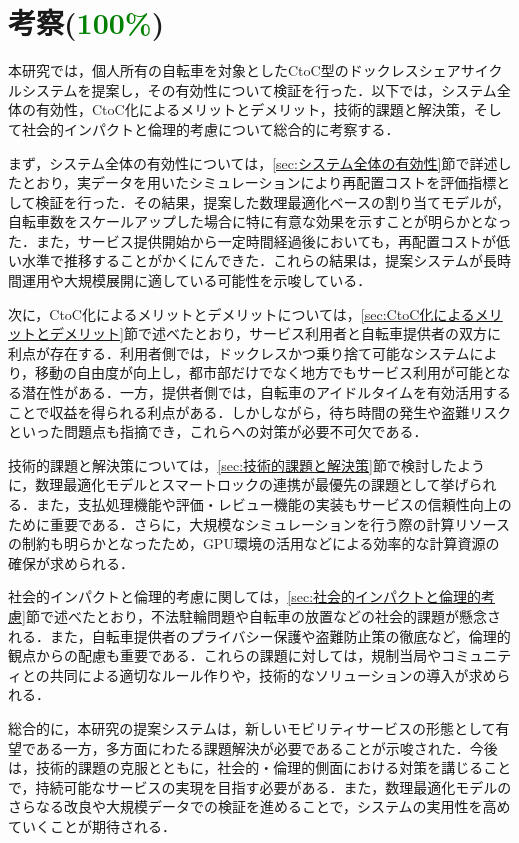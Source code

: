 \clearpage
\newpage

\section{考察(\textcolor{green}{100\%})}
  \label{sec:考察}
    \par 本研究では，個人所有の自転車を対象としたCtoC型のドックレスシェアサイクルシステムを提案し，その有効性について検証を行った．以下では，システム全体の有効性，CtoC化によるメリットとデメリット，技術的課題と解決策，そして社会的インパクトと倫理的考慮について総合的に考察する．
    \par まず，システム全体の有効性については，\ref{sec:システム全体の有効性}節で詳述したとおり，実データを用いたシミュレーションにより再配置コストを評価指標として検証を行った．その結果，提案した数理最適化ベースの割り当てモデルが，自転車数をスケールアップした場合に特に有意な効果を示すことが明らかとなった．また，サービス提供開始から一定時間経過後においても，再配置コストが低い水準で推移することがかくにんできた．これらの結果は，提案システムが長時間運用や大規模展開に適している可能性を示唆している．
    \par 次に，CtoC化によるメリットとデメリットについては，\ref{sec:CtoC化によるメリットとデメリット}節で述べたとおり，サービス利用者と自転車提供者の双方に利点が存在する．利用者側では，ドックレスかつ乗り捨て可能なシステムにより，移動の自由度が向上し，都市部だけでなく地方でもサービス利用が可能となる潜在性がある．一方，提供者側では，自転車のアイドルタイムを有効活用することで収益を得られる利点がある．しかしながら，待ち時間の発生や盗難リスクといった問題点も指摘でき，これらへの対策が必要不可欠である．
    \par 技術的課題と解決策については，\ref{sec:技術的課題と解決策}節で検討したように，数理最適化モデルとスマートロックの連携が最優先の課題として挙げられる．また，支払処理機能や評価・レビュー機能の実装もサービスの信頼性向上のために重要である．さらに，大規模なシミュレーションを行う際の計算リソースの制約も明らかとなったため，GPU環境の活用などによる効率的な計算資源の確保が求められる．
    \par 社会的インパクトと倫理的考慮に関しては，\ref{sec:社会的インパクトと倫理的考慮}節で述べたとおり，不法駐輪問題や自転車の放置などの社会的課題が懸念される．また，自転車提供者のプライバシー保護や盗難防止策の徹底など，倫理的観点からの配慮も重要である．これらの課題に対しては，規制当局やコミュニティとの共同による適切なルール作りや，技術的なソリューションの導入が求められる．
    \par 総合的に，本研究の提案システムは，新しいモビリティサービスの形態として有望である一方，多方面にわたる課題解決が必要であることが示唆された．今後は，技術的課題の克服とともに，社会的・倫理的側面における対策を講じることで，持続可能なサービスの実現を目指す必要がある．また，数理最適化モデルのさらなる改良や大規模データでの検証を進めることで，システムの実用性を高めていくことが期待される．
  
